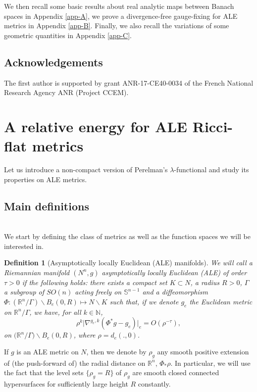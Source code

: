 \documentclass[a4paper,11pt,reqno]{amsart}
\newtheorem{defn}{Definition}[section]
\def\RR{\mathbb{R}}
\numberwithin{equation}{section}
\begin{document}
	We then recall some basic results about real analytic maps between Banach spaces in Appendix \ref{app-A}, we prove a divergence-free gauge-fixing for ALE metrics in Appendix \ref{app-B}. Finally, we also recall the variations of some geometric quantities in Appendix \ref{app-C}.
	
	\subsection{Acknowledgements}
The first author is supported by grant ANR-17-CE40-0034 of the French National Research Agency ANR (Project CCEM).	
	\section{A relative energy for ALE Ricci-flat metrics}\label{sec-rel-ene-ALE}
	
	Let us introduce a non-compact version of Perelman's $\lambda$-functional and study its properties on ALE metrics.
	
	\subsection{Main definitions}~~\\
	
	We start by defining the class of metrics as well as the function spaces we will be interested in.
	
	\begin{defn}[Asymptotically locally Euclidean (ALE) manifolds]\label{defn-ALE}
		We will call a Riemannian manifold $(N^n,g)$ \emph{asymptotically locally Euclidean} (ALE) of order $\tau>0$ if the following holds: there exists a compact set $K\subset N$, a radius $R>0$, $\Gamma$ a subgroup of $SO(n)$ acting freely on $\mathbb{S}^{n-1}$ and a diffeomorphism $\Phi : (\RR^n\slash\Gamma )\backslash B_e(0,R)\mapsto N\backslash K$ such that, if we denote $g_e$ the Euclidean metric on $\mathbb{R}^n\slash\Gamma$, we have, for all $k\in \mathbb{N}$,
		$$ \rho^k\big|\nabla^{g_e,k}(\Phi^*g-g_e)\big|_e = O(\rho^{-\tau}),$$
		on $\big(\RR^n\slash\Gamma\big) \backslash B_e(0,R)$, where $\rho = d_e(.,0)$.
	\end{defn}
	
	If $g$ is an ALE metric on $N$, then we denote by $\rho_g$ any smooth positive extension of (the push-forward of) the radial distance on $\RR^n$, $\Phi_{\ast}\rho$. In particular, we will use the fact that the level sets $\{\rho_g=R\}$ of $\rho_g$ are smooth closed connected hypersurfaces for sufficiently large height $R$ constantly.
	
\end{document}
